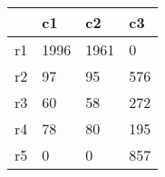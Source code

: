 \begin{table}[htbp]
\begin{tabular}{|l|l|l|l|}\hline  
 & c1  & c2  & c3  \\ \hline  
r1 & 1996 & 1961 & 0 \\ \hline 
r2 & 97 & 95 & 576 \\ \hline 
r3 & 60 & 58 & 272 \\ \hline 
r4 & 78 & 80 & 195 \\ \hline 
r5 & 0 & 0 & 857 \\ \hline 
  \end{tabular}
\end{table}
